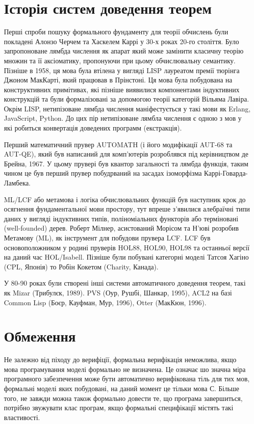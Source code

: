 \section{Історія систем доведення теорем}
Перші спроби пошуку формального фундаменту для теорії обчислень були покладені
Алонзо Черчем та Хаскелем Каррі у 30-х роках 20-го століття. Було запропоноване
лямбда числення як апарат який може замінити класичну теорію множин та її аксіоматику,
пропонуючи при цьому обчислювальну семантику. Пізніше в 1958, ця мова була втілена
у вигляді LISP лауреатом премії тюрінга Джоном МакКарті, який працював в Прінстоні.
Ця мова була побудована на конструктивних примітивах, які пізніше виявилися компонентами
індуктивних конструкцій та були формалізовані за допомогою
теорії категорій Вільяма Лавіра. Окрім LISP, нетипізоване лямбда числення
маніфестується у такі мови як Erlang, JavaScript, Python.
До цих пір нетипізоване лямбла числення є одною з мов у які робиться
конвертація доведених программ (екстракція).

Перший математичний прувер AUTOMATH (і його модифікації AUT-68 та AUT-QE),
який був написаний для комп'ютерів розроблявся під керівництвом де Брейна, 1967.
У цьому прувері був квантор загальності та лямбда функція, таким чином це був перший прувер
побудрваний на засадах ізоморфізма Каррі-Говарда-Ламбека.

ML/LCF або метамова і логіка обчислювальних функцій був наступник крок до
осягнення фундаментальної мови простору, тут впреше з'явилися алебраїчні типи даних
у вигляді індуктивних типів, поліноміальних функторів або терміновані (well-founded) дерев.
Роберт Мілнер, асистований Морісом та Н'юві розробив Метамову (ML), як
інструмент для побудови прувера LCF. LCF був основоположником у родині пруверів
HOL88, HOL90, HOL98 та останньої версії на даний час HOL/Isabell.
Пізніше були побувані категорні моделі Татсоя Хагіно (CPL, Японія)
то Робін Кокетом (Charity, Канада).

У 80-90 роках були створені інші системи автоматичного доведення теорем,
такі як Mizar (Трибулєк, 1989). PVS (Оур, Рушбі, Шанкар, 1995),
ACL2 на базі Common Lisp (Боєр, Кауфман, Мур, 1996), Otter (МакКюн, 1996).

\section{Обмеження}
Не залежно від піходу до верифіції, формальна верифікація неможлива,
якщо мова програмування моделі формально не визначена. Це означає шо значна міра
програмного забезпечення може бути автоматично верифікована тіль для тих мов,
формальні моделі яких побудовані, на даний момент це тільки мова С.
Більше того, не завжди можна також формально довести те, що програма завершиться,
потрібно звужувати клас програм, якщо формальні специфікації містять такі властивості.

